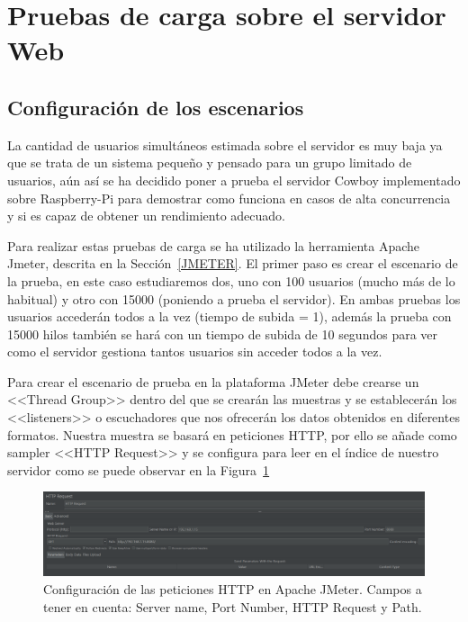 \section{Pruebas de carga sobre el servidor Web}
\subsection{Configuración de los escenarios}
La cantidad de usuarios simultáneos estimada sobre el servidor es muy baja ya que se trata de un sistema pequeño y pensado para un grupo limitado de usuarios, aún así se ha decidido poner a prueba el servidor Cowboy implementado sobre Raspberry-Pi para demostrar como funciona en casos de alta concurrencia y si es capaz de obtener un rendimiento adecuado. 

Para realizar estas pruebas de carga se ha utilizado la herramienta Apache Jmeter, descrita en la Sección~\ref{JMETER}. El primer paso es crear el escenario de la prueba, en este caso estudiaremos dos, uno con 100 usuarios (mucho más de lo habitual) y otro con 15000 (poniendo a prueba el servidor). En ambas pruebas los usuarios accederán todos a la vez (tiempo de subida = 1), además la prueba con 15000 hilos también se hará con un tiempo de subida de 10 segundos para ver como el servidor gestiona tantos usuarios sin acceder todos a la vez.

Para crear el escenario de prueba en la plataforma JMeter debe crearse un <<Thread Group>> dentro del que se crearán las muestras y se establecerán los <<listeners>> o escuchadores que nos ofrecerán los datos obtenidos en diferentes formatos. Nuestra muestra se basará en peticiones HTTP, por ello se añade como sampler <<HTTP Request>> y se configura para leer en el índice de nuestro servidor como se puede observar en la Figura~\ref{fig:JmeterConfig} 

\begin{figure}[h]
\centering
\includegraphics[scale=0.52]{images/configJmeter.png}
\caption[Configuración HTTP Request JMeter]{Configuración de las peticiones HTTP en Apache JMeter. Campos a tener en cuenta: Server name, Port Number, HTTP Request y Path.}%
\label{fig:JmeterConfig}
\end{figure}

